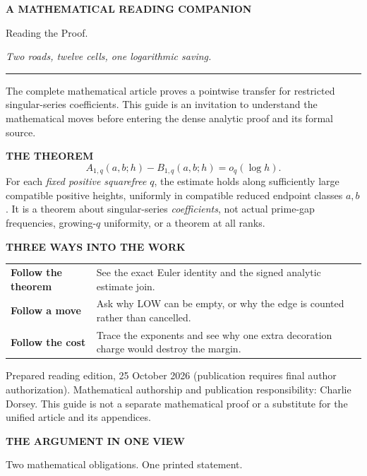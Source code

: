 \documentclass[11pt,letterpaper]{article}
\newcommand{\kicker}[1]{{\sffamily\small\bfseries\color{pine}\MakeUppercase{#1}}}
\newcommand{\subtitle}[1]{{\sffamily\small\color{muted}#1}}
\begin{document}
\thispagestyle{empty}
\vspace*{1.0in}
\kicker{A mathematical reading companion}\par
\vspace{13pt}
{\fontsize{40}{44}\selectfont Reading the Proof.}\par
\vspace{8pt}
{\Large\itshape Two roads, twelve cells, one logarithmic saving.}\par
\vspace{20pt}
\color{pine}\rule{0.83\linewidth}{0.7pt}\color{ink}\par
\vspace{24pt}
The complete mathematical article proves a pointwise transfer for restricted singular-series
coefficients. This guide is an invitation to understand the mathematical
moves before entering the dense analytic proof and its formal source.

\begin{quietbox}
\kicker{The theorem}\vspace{7pt}
\[
 A_{1,q}(a,b;h)-B_{1,q}(a,b;h)=o_q(\log h).
\]
For each \emph{fixed positive squarefree} $q$, the estimate holds along
sufficiently large compatible positive heights, uniformly in compatible
reduced endpoint classes $a,b$. It is a theorem about singular-series
\emph{coefficients}, not actual prime-gap frequencies, growing-$q$ uniformity,
or a theorem at all ranks.
\end{quietbox}
\vspace{7pt}
\par\smallskip{}\par\medskip
\kicker{Three ways into the work}\par
\begin{tabularx}{\linewidth}{@{}p{1.38in}X@{}}
\textbf{Follow the theorem} & See the exact Euler identity and the signed analytic estimate join.\\[6pt]
\textbf{Follow a move} & Ask why LOW can be empty, or why the edge is counted rather than cancelled.\\[6pt]
\textbf{Follow the cost} & Trace the exponents and see why one extra decoration charge would destroy the margin.\\
\end{tabularx}
\vfill
\subtitle{Prepared reading edition, 25 October 2026 (publication requires final author authorization). Mathematical authorship and publication responsibility: Charlie Dorsey. This guide is not a separate mathematical proof or a substitute for the unified article and its appendices.}\par
\newpage
\kicker{The argument in one view}\par\vspace{8pt}
{\Large Two mathematical obligations. One printed statement.}\par
\end{document}
